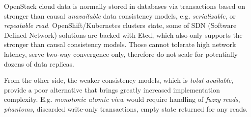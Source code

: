 \documentclass[conference]{IEEEtran}
\begin{document}
OpenStack cloud data is normally stored in databases via transactions based on
stronger than causal \textit{unavailable}\cite{b4} data consistency models,
e.g. \textit{serializable}\cite{b4}, or \textit{repeatable read}\cite{b4}.
OpenShift/Kubernetes clusters state, some of SDN (Software Defined
Network) solutions are backed with Etcd, which also only supports
the stronger than causal consistency models. Those cannot tolerate high network
latency, serve two-way convergence only, therefore do not scale for potentially
dozens of data replicas.

From the other side, the weaker consistency models, which is \textit{total
available}\cite{b4}, provide a poor alternative that brings greatly increased
implementation complexity. E.g. \textit{monotonic atomic view}\cite{b4} would
require handling of \textit{fuzzy reads}\cite{b4}, \textit{phantoms}\cite{b4},
discarded write-only transactions, empty state returned for any reads.
\end{document}
